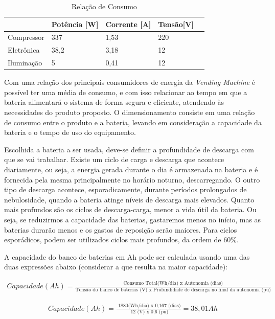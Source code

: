 \begin{table}[]
\centering
\caption{Relação de Consumo}
\label{my-label}
\begin{tabular}{|l|l|l|l|l|}
\hline
           & Potência {[}W{]} & Corrente {[}A{]} & Tensão{[}V{]}  \\ \hline
Compressor & 337            & 1,53           & 220           \\ \hline
Eletrônica & 38,2                & 3,18                 &12         \\ \hline
Iluminação & 5            & 0,41            & 12          \\ \hline
\end{tabular}
\end{table}
		
        Com uma relação dos principais consumidores de energia da \textit{Vending Machine} é possível ter uma média de consumo, e com isso relacionar ao tempo em que a bateria alimentará o sistema de forma segura e eficiente, atendendo às necessidades do produto proposto. O dimensionamento consiste em uma relação de consumo entre o produto e a bateria, levando em consideração a capacidade da bateria e o tempo de uso do equipamento.

		Escolhida a bateria a ser usada, deve-se definir a profundidade de descarga com que se vai trabalhar. Existe um ciclo de carga e descarga que acontece diariamente, ou seja, a energia gerada durante o dia é armazenada na bateria e é fornecida pela mesma principalmente no horário noturno, descarregando. O outro tipo de descarga acontece, esporadicamente, durante períodos prolongados de nebulosidade, quando a bateria atinge níveis de descarga mais elevados.
Quanto mais profundos são os ciclos de descarga-carga, menor a vida útil da bateria. Ou seja, se reduzirmos a capacidade das baterias, gastaremos menos no início, mas as baterias durarão menos e os gastos de reposição serão maiores. Para ciclos esporádicos, podem ser utilizados ciclos mais profundos, da ordem de 60\%.

A capacidade do banco de baterias em Ah pode ser calculada usando uma das duas expressões abaixo (considerar a que resulta na maior capacidade):

\begin{eqnarray}
Capacidade (Ah) = \frac{\text{Consumo Total(Wh/dia) x Autonomia (dias)} }{\text{Tensão do banco de baterias (V) x Profundidade de descarga no final da autonomia (pu)}} 
\end{eqnarray}

\begin{eqnarray}
Capacidade (Ah) = \frac{\text{ 1880(Wh/dia) x 0,167 (dias)} }{\text{ 12 (V) x 0,6 (pu)}} =  38,01 Ah
\end{eqnarray}

